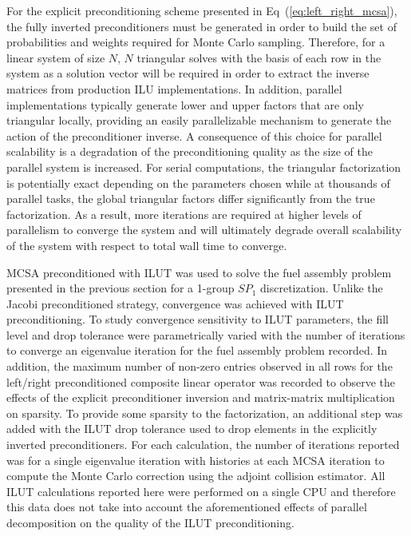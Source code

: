For the explicit preconditioning scheme presented in
Eq~(\ref{eq:left_right_mcsa}), the fully inverted preconditioners must
be generated in order to build the set of probabilities and weights
required for Monte Carlo sampling. Therefore, for a linear system of
size $N$, $N$ triangular solves with the basis of each row in the
system as a solution vector will be required in order to extract the
inverse matrices from production ILU implementations. In addition,
parallel implementations typically generate lower and upper factors
that are only triangular locally, providing an easily parallelizable
mechanism to generate the action of the preconditioner inverse. A
consequence of this choice for parallel scalability is a degradation
of the preconditioning quality as the size of the parallel system is
increased. For serial computations, the triangular factorization is
potentially exact depending on the parameters chosen while at
thousands of parallel tasks, the global triangular factors differ
significantly from the true factorization. As a result, more
iterations are required at higher levels of parallelism to converge
the system and will ultimately degrade overall scalability of the
system with respect to total wall time to converge.

MCSA preconditioned with ILUT was used to solve the fuel assembly
problem presented in the previous section for a 1-group $SP_1$
discretization. Unlike the Jacobi preconditioned strategy, convergence
was achieved with ILUT preconditioning. To study convergence
sensitivity to ILUT parameters, the fill level and drop tolerance were
parametrically varied with the number of iterations to converge an
eigenvalue iteration for the fuel assembly problem recorded. In
addition, the maximum number of non-zero entries observed in all rows
for the left/right preconditioned composite linear operator was
recorded to observe the effects of the explicit preconditioner
inversion and matrix-matrix multiplication on sparsity. To provide
some sparsity to the factorization, an additional step was added with
the ILUT drop tolerance used to drop elements in the explicitly
inverted preconditioners. For each calculation, the number of
iterations reported was for a single eigenvalue iteration with
 histories at each MCSA iteration to compute the Monte Carlo
correction using the adjoint collision estimator. All ILUT
calculations reported here were performed on a single CPU and
therefore this data does not take into account the aforementioned
effects of parallel decomposition on the quality of the ILUT
preconditioning.

